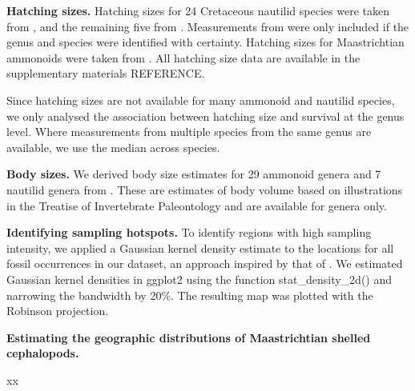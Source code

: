 \documentclass[a4paper]{article}
\begin{document}
\textbf{Hatching sizes.} Hatching sizes for 24 Cretaceous nautilid species were taken from \textcite{laptikhovskyEnvironmentalImpactEctocochleate2013}, and the remaining five from \parencite{cichowolskiNautiloidGenusCymatoceras2003, malchykShellOrnamentSystematic2017, tajikaIntraInterspecificVariability2022, landmanNautilidNurseriesHatchlings2018}. Measurements from \textcite{laptikhovskyEnvironmentalImpactEctocochleate2013} were only included if the genus and species were identified with certainty.
Hatching sizes for Maastrichtian ammonoids were taken from \parencite{laptikhovskyEnvironmentalImpactEctocochleate2013, debaetsAmmonoidEmbryonicDevelopment2015, takaiConservativeOntogeneticTrajectories2022, shigetaNewSpeciesTetragonites2024}. 
All hatching size data are available in the supplementary materials REFERENCE. 

Since hatching sizes are not available for many ammonoid and nautilid species, we only analysed the association between hatching size and survival at the genus level. Where measurements from multiple species from the same genus are available, we use the median across species. 

\textbf{Body sizes.} We derived body size estimates for 29 ammonoid genera and 7 nautilid genera from \parencite{heimCopesRuleEvolution2015, payneBodySizeSampling2020}. These are estimates of body volume based on illustrations in the Treatise of Invertebrate Paleontology \parencite{wrightTreatiseInvertebratePaleontology1996} and are available for genera only. 

\textbf{Identifying sampling hotspots.} To identify regions with high sampling intensity, we applied a Gaussian kernel density estimate to the locations for all fossil occurrences in our dataset, an approach inspired by that of \textcite{chiarenzaEcologicalNicheModelling2019}. 
We estimated Gaussian kernel densities in ggplot2 \parencite{wickhamGgplot2ElegantGraphics2016} using the function stat\_density\_2d() and narrowing the bandwidth by 20\%.
The resulting map was plotted with the Robinson projection. 

\textbf{Estimating the geographic distributions of Maastrichtian shelled cephalopods.}

xx
\end{document}
